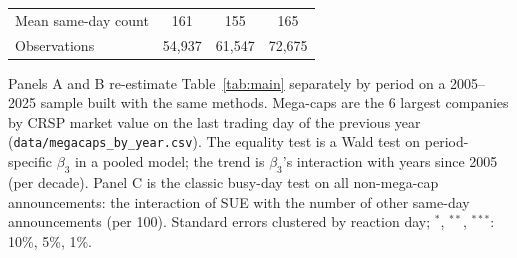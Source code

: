 \begin{table}[htbp]
\begin{tabular}{lccc}
Mean same-day count & 161 & 155 & 165 \\
Observations & 54,937 & 61,547 & 72,675 \\
\bottomrule
\end{tabular}
\par\medskip
\parbox{0.95\linewidth}{\footnotesize Panels A and B re-estimate Table~\ref{tab:main} separately by period on a 2005--2025 sample built with the same methods. Mega-caps are the 6 largest companies by CRSP market value on the last trading day of the previous year (\texttt{data/megacaps\_by\_year.csv}). The equality test is a Wald test on period-specific $\beta_3$ in a pooled model; the trend is $\beta_3$'s interaction with years since 2005 (per decade). Panel C is the classic busy-day test on all non-mega-cap announcements: the interaction of SUE with the number of other same-day announcements (per 100). Standard errors clustered by reaction day; $^{*}$, $^{**}$, $^{***}$: 10\%, 5\%, 1\%.}
\end{table}
